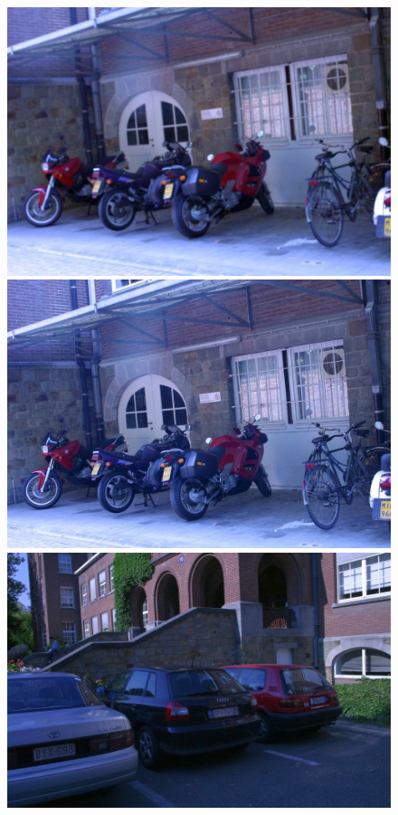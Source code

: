 		\begin{figure}[!htb]
				\includegraphics[width=\linewidth]{images/experiments/motos3}
				\label{fig:awesome_image1}
			\endminipage\hfill
				\includegraphics[width=\linewidth]{images/experiments/motos1}
				\label{fig:awesome_image2}
			\endminipage\hfill
				\includegraphics[width=\linewidth]{images/experiments/cars4}

\end{figure}
